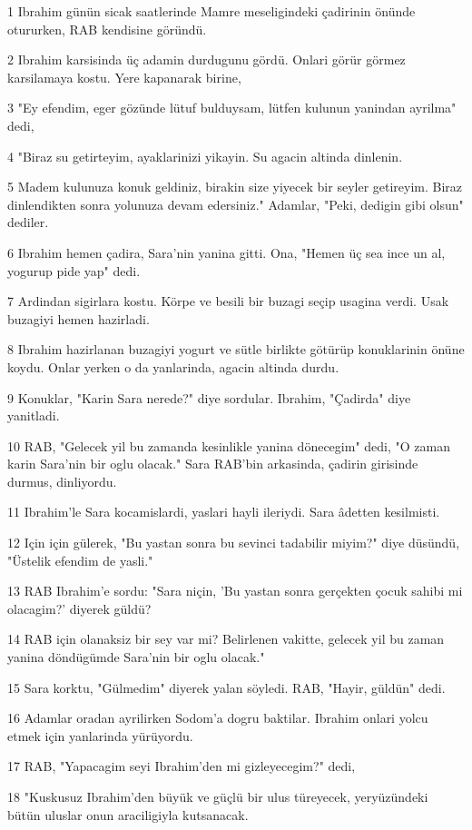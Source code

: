 \par 1 Ibrahim günün sicak saatlerinde Mamre meseligindeki çadirinin önünde otururken, RAB kendisine göründü.
\par 2 Ibrahim karsisinda üç adamin durdugunu gördü. Onlari görür görmez karsilamaya kostu. Yere kapanarak birine,
\par 3 "Ey efendim, eger gözünde lütuf bulduysam, lütfen kulunun yanindan ayrilma" dedi,
\par 4 "Biraz su getirteyim, ayaklarinizi yikayin. Su agacin altinda dinlenin.
\par 5 Madem kulunuza konuk geldiniz, birakin size yiyecek bir seyler getireyim. Biraz dinlendikten sonra yolunuza devam edersiniz." Adamlar, "Peki, dedigin gibi olsun" dediler.
\par 6 Ibrahim hemen çadira, Sara'nin yanina gitti. Ona, "Hemen üç sea ince un al, yogurup pide yap" dedi.
\par 7 Ardindan sigirlara kostu. Körpe ve besili bir buzagi seçip usagina verdi. Usak buzagiyi hemen hazirladi.
\par 8 Ibrahim hazirlanan buzagiyi yogurt ve sütle birlikte götürüp konuklarinin önüne koydu. Onlar yerken o da yanlarinda, agacin altinda durdu.
\par 9 Konuklar, "Karin Sara nerede?" diye sordular. Ibrahim, "Çadirda" diye yanitladi.
\par 10 RAB, "Gelecek yil bu zamanda kesinlikle yanina dönecegim" dedi, "O zaman karin Sara'nin bir oglu olacak." Sara RAB'bin arkasinda, çadirin girisinde durmus, dinliyordu.
\par 11 Ibrahim'le Sara kocamislardi, yaslari hayli ileriydi. Sara âdetten kesilmisti.
\par 12 Için için gülerek, "Bu yastan sonra bu sevinci tadabilir miyim?" diye düsündü, "Üstelik efendim de yasli."
\par 13 RAB Ibrahim'e sordu: "Sara niçin, 'Bu yastan sonra gerçekten çocuk sahibi mi olacagim?' diyerek güldü?
\par 14 RAB için olanaksiz bir sey var mi? Belirlenen vakitte, gelecek yil bu zaman yanina döndügümde Sara'nin bir oglu olacak."
\par 15 Sara korktu, "Gülmedim" diyerek yalan söyledi. RAB, "Hayir, güldün" dedi.
\par 16 Adamlar oradan ayrilirken Sodom'a dogru baktilar. Ibrahim onlari yolcu etmek için yanlarinda yürüyordu.
\par 17 RAB, "Yapacagim seyi Ibrahim'den mi gizleyecegim?" dedi,
\par 18 "Kuskusuz Ibrahim'den büyük ve güçlü bir ulus türeyecek, yeryüzündeki bütün uluslar onun araciligiyla kutsanacak.
